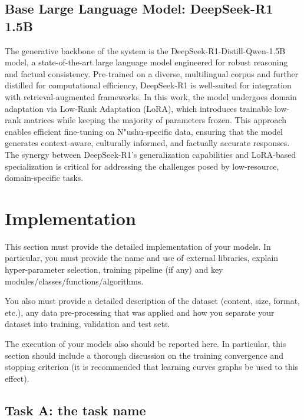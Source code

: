 \documentclass{article}
\begin{document}
\subsection{Base Large Language Model: DeepSeek-R1 1.5B}
\label{ssec:deepseek_model}
    The generative backbone of the system is the DeepSeek-R1-Distill-Qwen-1.5B model, a state-of-the-art large language model engineered for robust reasoning and factual consistency. Pre-trained on a diverse, multilingual corpus and further distilled for computational efficiency, DeepSeek-R1 is well-suited for integration with retrieval-augmented frameworks. In this work, the model undergoes domain adaptation via Low-Rank Adaptation (LoRA), which introduces trainable low-rank matrices while keeping the majority of parameters frozen. This approach enables efficient fine-tuning on N"{u}shu-specific data, ensuring that the model generates context-aware, culturally informed, and factually accurate responses. The synergy between DeepSeek-R1's generalization capabilities and LoRA-based specialization is critical for addressing the challenges posed by low-resource, domain-specific tasks.
    














    
\section{Implementation}
\label{sec:impl}
    This section must provide the detailed implementation of your models. In particular, you must provide the name and use of external libraries, explain hyper-parameter selection, training pipeline (if any) and key modules/classes/functions/algorithms.
    
    You also must provide a detailed description of the dataset (content, size, format, etc.), any data pre-processing that was applied and how you separate your dataset into training, validation and test sets.
    
    The execution of your models also should be reported here. In particular, this section should include a thorough discussion on the training convergence and stopping criterion (it is recommended that learning curves graphs be used to this effect).

    \subsection{Task A: the task name}
    \label{ssec:imp_models_A1}
\end{document}
